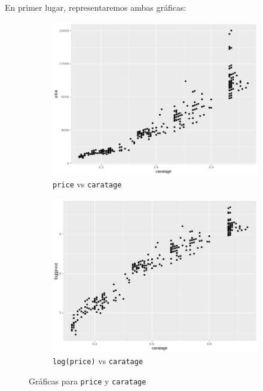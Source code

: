 \documentclass[a4paper, 7pt]{article}
\begin{document}
En primer lugar, representaremos ambas gráficas:

\begin{figure}[h!]
  \centering
  \begin{subfigure}[b]{0.25\linewidth}
    \includegraphics[width=\linewidth]{report/images/question-1/price.png}
    \caption{\texttt{price} vs \texttt{caratage}}
  \end{subfigure}
  \begin{subfigure}[b]{0.25\linewidth}
    \includegraphics[width=\linewidth]{report/images/question-1/logprice.png}
    \caption{\texttt{log(price)} vs \texttt{caratage}}
  \end{subfigure}
  \caption{Gráficas para \texttt{price} y \texttt{caratage}}
  \label{fig:coffee}
\end{figure}
\end{document}
